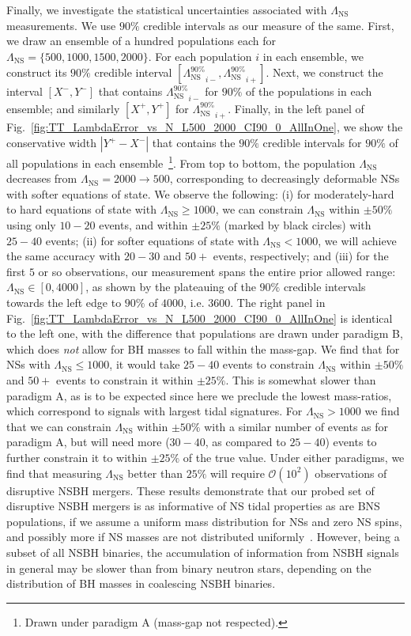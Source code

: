 \documentclass[aps,prd,amsmath,floats,floatfix, twocolumn,
superscriptaddress,nofootinbib,showpacs]{revtex4-1}
\newcommand{\lambdans}{\Lambda_\mathrm{NS}}
\begin{document}
Finally, we investigate the statistical uncertainties associated with
$\lambdans$ measurements. We use $90\%$ credible intervals as our measure of
the same. First, we draw an ensemble of a hundred populations each for
$\lambdans=\{500,1000,1500,2000\}$. For each population $i$ in each ensemble,
we construct
its $90\%$ credible interval $[{\lambdans^{90\%}}_{i-},{\lambdans^{90\%}}_{i+}]$.
Next, we construct the interval $[X^-,Y^-]$ that contains ${\lambdans^{90\%}}_{i-}$
for $90\%$ of the populations in each ensemble; and similarly $[X^+,Y^+]$
for ${\lambdans^{90\%}}_{i+}$. Finally, in the left panel of 
Fig.~\ref{fig:TT_LambdaError_vs_N_L500_2000_CI90_0_AllInOne}, we show the
conservative width $|Y^+ - X^-|$ that contains the $90\%$ credible
intervals for $90\%$ of all populations in each ensemble~\footnote{Drawn
under paradigm A (mass-gap not respected).}.
% 
From top to bottom, the population $\lambdans$
decreases from $\lambdans=2000\rightarrow 500$, corresponding to decreasingly
deformable NSs with softer equations of state. We observe the following:
(i) for moderately-hard to hard equations of state with $\lambdans\geq 1000$,
we can constrain $\lambdans$ within $\pm 50\%$ using only $10-20$ events, and
within $\pm 25\%$ (marked by black circles) with $25-40$ events; (ii) for softer 
equations of state with
$\lambdans<1000$, we will achieve the same accuracy with $20-30$ and $50+$ 
events, respectively; and (iii) for the first $5$ or so observations, our
measurement spans the entire prior allowed range:
$\lambdans\in[0,4000]$, as shown by the plateauing of the $90\%$ 
credible intervals towards the left edge to $90\%$ of $4000$, i.e. $3600$.
% 
The right panel in Fig.~\ref{fig:TT_LambdaError_vs_N_L500_2000_CI90_0_AllInOne}
is identical to the left one, with the difference that populations are drawn
under paradigm B, which does {\it not} allow for BH masses to fall within
the mass-gap. We find that
for NSs with $\lambdans\leq 1000$, it would take $25-40$ events to
constrain $\lambdans$ within $\pm 50\%$ and $50+$ events to constrain it
within $\pm 25\%$. This is somewhat slower than paradigm A, as is to be
expected since here we preclude the lowest mass-ratios, which correspond to
signals with largest tidal signatures. For $\lambdans>1000$ we find that we
can constrain $\lambdans$ within $\pm 50\%$ with a similar number of events as
for paradigm A, but will need more ($30-40$, as compared to $25-40$) events
to further constrain it to within $\pm 25\%$ of the true value.
% 
Under either paradigms, we find that measuring $\lambdans$ better than
$25\%$ will require $\mathcal{O}(10^2)$ observations of disruptive NSBH
mergers.
% 
These results demonstrate that our probed set of disruptive NSBH mergers is as
informative of NS tidal properties as are BNS populations, if we assume a uniform mass
distribution for NSs and zero NS spins, and possibly more if NS masses are
not distributed uniformly~\cite{Agathos:2015a}.
However, being a subset of all NSBH binaries, the accumulation of information
from NSBH signals in general may be slower than from binary neutron stars,
depending on the distribution of BH masses in coalescing NSBH binaries.
\end{document}
